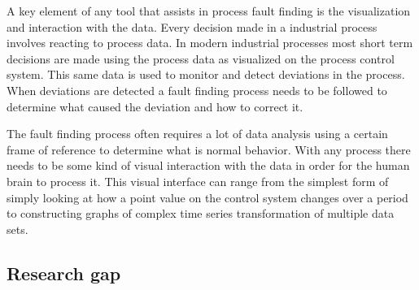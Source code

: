 A key element of any tool that assists in process fault finding is the visualization and interaction with the data. Every decision made in a industrial process involves reacting to process data. In modern industrial processes most short term decisions are made using the process data as visualized on the process control system. This same data is used to monitor and detect deviations in the process. When deviations are detected a fault finding process needs to be followed to determine what caused the deviation and how to correct it.\par
The fault finding process often requires a lot of data analysis using a certain frame of reference to determine what is normal behavior. With any process there needs to be some kind of visual interaction with the data in order for the human brain to process it. This visual interface can range from the simplest form of simply looking at how a point value on the control system changes over a period to constructing graphs of complex time series transformation of multiple data sets.\par

\subsection{Research gap}

